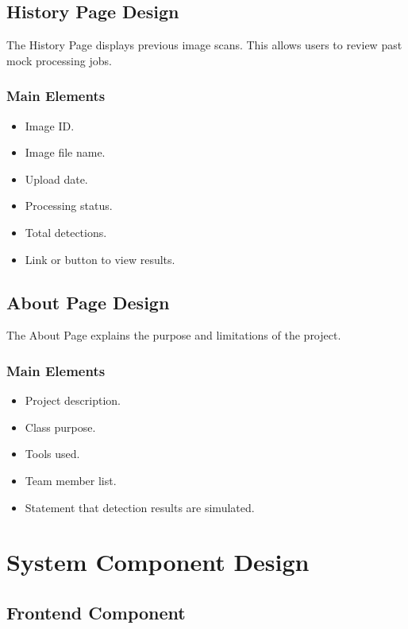 \documentclass[12pt]{article}
\begin{document}
\subsection{History Page Design}

The History Page displays previous image scans. This allows users to review past mock processing jobs.

\subsubsection{Main Elements}

\begin{itemize}
    \item Image ID.
    \item Image file name.
    \item Upload date.
    \item Processing status.
    \item Total detections.
    \item Link or button to view results.
\end{itemize}

\subsection{About Page Design}

The About Page explains the purpose and limitations of the project.

\subsubsection{Main Elements}

\begin{itemize}
    \item Project description.
    \item Class purpose.
    \item Tools used.
    \item Team member list.
    \item Statement that detection results are simulated.
\end{itemize}

\section{System Component Design}

\subsection{Frontend Component}
\end{document}
